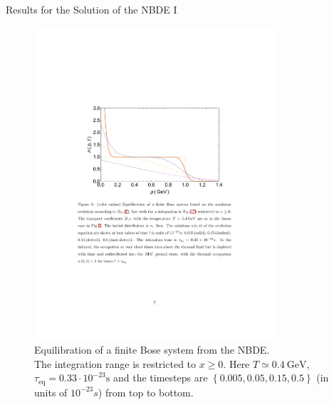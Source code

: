\begin{frame}{Results for the Solution of the NBDE I}
\begin{figure}[H]
\centering
\includegraphics[width=0.8\textwidth]{figures/nbde_positive_range}
\caption{Equilibration of a finite Bose system from the NBDE. \cite{Wolschin2018} \\ 
The integration range is restricted to $x \geq 0$. Here $T\simeq 0.4\ \mathrm{GeV}$, $\tau_{\mathrm{eq}} =  0.33\cdot 10^{-23} \mathrm{s}$ and the timesteps are $\left\{0.005, 0.05, 0.15,0.5\right\}$ (in units of $10^{-23}s$) from top to bottom.}
\end{figure}
\end{frame}


